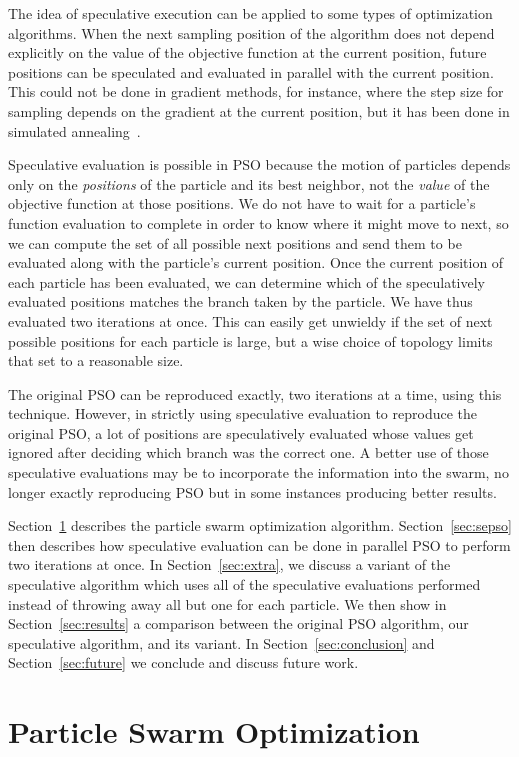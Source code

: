 \documentclass[oneside,honors]{honors}
\renewcommand{\sec}[1]{Section~\ref{sec:#1}}
\begin{document}
The idea of speculative execution can be applied to some types of optimization
algorithms.  When the next sampling position of the algorithm does not depend
explicitly on the value of the objective function at the current position,
future positions can be speculated and evaluated in parallel with the current
position.  This could not be done in gradient methods, for instance, where the
step size for sampling depends on the gradient at the current position, but it
has been done in simulated annealing~\cite{witte-tpds91}.

Speculative evaluation is possible in PSO because the motion of particles
depends only on the \emph{positions} of the particle and its best neighbor, not
the \emph{value} of the objective function at those positions.  We do not have
to wait for a particle's function evaluation to complete in order to know where
it might move to next, so we can compute the set of all possible next positions
and send them to be evaluated along with the particle's current position.  Once
the current position of each particle has been evaluated, we can determine
which of the speculatively evaluated positions matches the branch taken by the
particle.  We have thus evaluated two iterations at once.  This can easily get
unwieldy if the set of next possible positions for each particle is large, but
a wise choice of topology limits that set to a reasonable size.

The original PSO can be reproduced exactly, two iterations at a time, using
this technique.  However, in strictly using speculative evaluation to reproduce
the original PSO, a lot of positions are speculatively evaluated whose values
get ignored after deciding which branch was the correct one.  A better use of
those speculative evaluations may be to incorporate the information into the
swarm, no longer exactly reproducing PSO but in some instances producing better
results.

\sec{pso} describes the particle swarm optimization algorithm.  \sec{sepso}
then describes how speculative evaluation can be done in parallel PSO to
perform two iterations at once.  In \sec{extra}, we discuss a variant of the
speculative algorithm which uses all of the speculative evaluations performed
instead of throwing away all but one for each particle.  We then show in
\sec{results} a comparison between the original PSO algorithm, our speculative
algorithm, and its variant.  In \sec{conclusion} and \sec{future} we conclude
and discuss future work.

\section{Particle Swarm Optimization}
\label{sec:pso}
\end{document}
